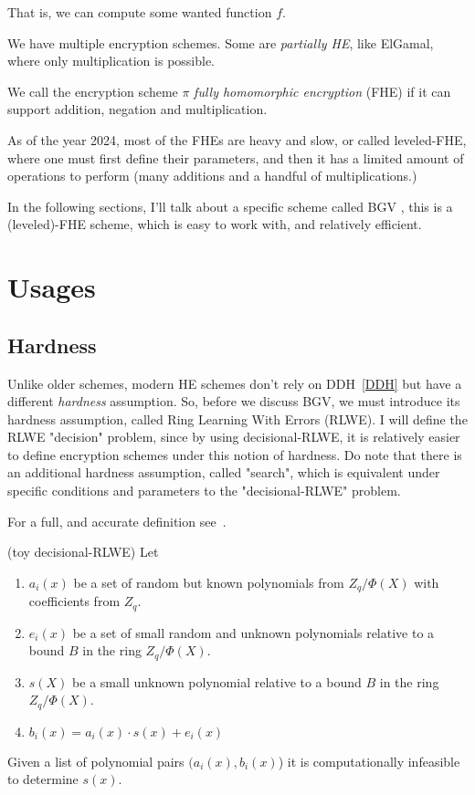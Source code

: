 That is, we can compute some wanted function $f$.

We have multiple encryption schemes. Some are \emph{partially HE},
like ElGamal, where only multiplication is possible.
\begin{theorem}
 We call the encryption scheme $\pi$ \emph{fully homomorphic encryption} (FHE) if it 
 can support addition, negation and multiplication.
\end{theorem}

As of the year 2024, most of the FHEs are heavy and slow,
or called leveled-FHE, where one must first define their parameters, 
and then it has a limited amount of operations to perform (many additions and a 
handful of multiplications.)

In the following sections, I'll talk about a specific scheme called BGV \cite{BGV},
this is a (leveled)-FHE scheme, which is easy to work with, and relatively efficient.

\section{Usages}
\subsection{Hardness}
Unlike older schemes, modern HE schemes don't rely on DDH~\ref{DDH} 
but have a different \emph{hardness} assumption.
So, before we discuss BGV, we must introduce its hardness assumption,
called Ring Learning With Errors (RLWE). 
I will define the RLWE "decision" problem, since by using decisional-RLWE,
it is relatively easier to define encryption schemes under this notion of hardness.
Do note that there is an additional hardness assumption, called "search", 
which is equivalent under specific conditions and parameters to 
the "decisional-RLWE" problem.

For a full, and accurate definition see~\cite[def 3.3]{RLWE}.
\begin{definition} (toy decisional-RLWE)
    Let 
    \begin{enumerate}
        \item $a_i(x)$ be a set of random but known polynomials from $Z_q/\Phi(X)$ with 
        coefficients from $Z_q$.
        \item  $e_i(x)$ be a set of small random and unknown polynomials 
        relative to a bound $B$ in the ring $Z_q/\Phi(X)$.
        \item $s(X)$ be a small unknown polynomial 
        relative to a bound $B$ in the ring $Z_q/\Phi(X)$.
        \item $b_i(x)=a_i(x)\cdot s(x) + e_i(x)$
    \end{enumerate}
    
    Given a list of polynomial pairs $(a_i(x),b_i(x)$) it is computationally infeasible 
    to determine $s(x)$.
\end{definition}

